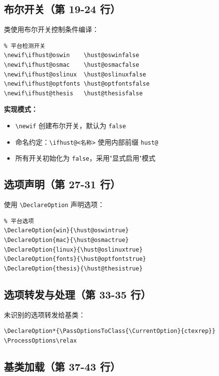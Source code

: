 \documentclass[linux]{hustreport}
\begin{document}
\subsection{布尔开关（第 19-24 行）}

类使用布尔开关控制条件编译：

\begin{verbatim}
% 平台检测开关
\newif\ifhust@oswin    \hust@oswinfalse
\newif\ifhust@osmac    \hust@osmacfalse
\newif\ifhust@oslinux  \hust@oslinuxfalse
\newif\ifhust@optfonts \hust@optfontsfalse
\newif\ifhust@thesis   \hust@thesisfalse
\end{verbatim}

\textbf{实现模式：}
\begin{itemize}
    \item \verb|\newif| 创建布尔开关，默认为 \texttt{false}
    \item 命名约定：\verb|\ifhust@<名称>| 使用内部前缀 \verb|hust@|
    \item 所有开关初始化为 \texttt{false}，采用"显式启用"模式
\end{itemize}

\subsection{选项声明（第 27-31 行）}

使用 \verb|\DeclareOption| 声明选项：

\begin{verbatim}
% 平台选项
\DeclareOption{win}{\hust@oswintrue}
\DeclareOption{mac}{\hust@osmactrue}
\DeclareOption{linux}{\hust@oslinuxtrue}
\DeclareOption{fonts}{\hust@optfontstrue}
\DeclareOption{thesis}{\hust@thesistrue}
\end{verbatim}

\subsection{选项转发与处理（第 33-35 行）}

未识别的选项转发给基类：

\begin{verbatim}
\DeclareOption*{\PassOptionsToClass{\CurrentOption}{ctexrep}}
\ProcessOptions\relax
\end{verbatim}

\subsection{基类加载（第 37-43 行）}
\end{document}
